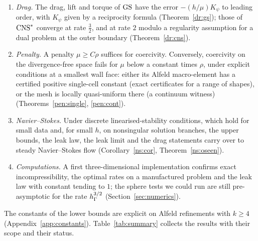 \begin{enumerate}[label=\textbf{\arabic*.},leftmargin=1.6em]
\item \emph{Drag.} The drag, lift and torque of $\mathrm{GS}$ have the error $-(h/\mu)K_\psi$ to leading order, with $K_\psi$ given by a reciprocity formula (Theorem~\ref{dr:gs}); those of $\mathrm{CNS}^\ast$ converge at rate $\frac32$, and at rate $2$ modulo a regularity assumption for a dual problem at the outer boundary (Theorem~\ref{dr:cns}).
\item \emph{Penalty.} A penalty $\mu\ge C\rho$ suffices for coercivity. Conversely, coercivity on the divergence-free space fails for $\mu$ below a constant times $\rho$, under explicit conditions at a smallest wall face: either its Alfeld macro-element has a certified positive single-cell constant (exact certificates for a range of shapes), or the mesh is locally quasi-uniform there (a continuum witness) (Theorems~\ref{pen:single}, \ref{pen:cont}).
\item \emph{Navier--Stokes.} Under discrete linearised-stability conditions, which hold for small data and, for small $h$, on nonsingular solution branches, the upper bounds, the leak law, the leak limit and the drag statements carry over to steady Navier--Stokes flow (Corollary~\ref{ns:cor}, Theorem~\ref{ns:oseen}).
\item \emph{Computations.} A first three-dimensional implementation confirms exact incompressibility, the optimal rates on a manufactured problem and the leak law with constant tending to $1$; the sphere tests we could run are still pre-asymptotic for the rate $h_\Gamma^{3/2}$ (Section~\ref{sec:numerics}).
\end{enumerate}
The constants of the lower bounds are explicit on Alfeld refinements with $k\ge4$ (Appendix~\ref{app:constants}). Table~\ref{tab:summary} collects the results with their scope and their status.

